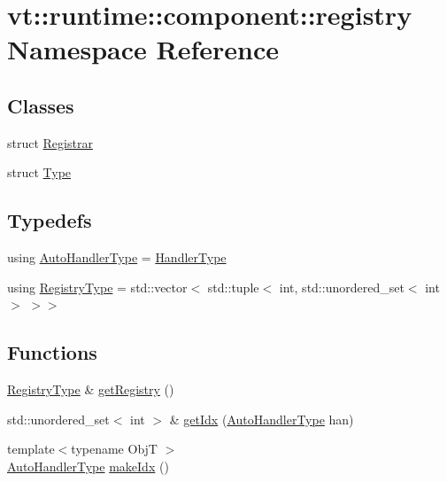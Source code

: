 \hypertarget{namespacevt_1_1runtime_1_1component_1_1registry}{}\section{vt\+:\+:runtime\+:\+:component\+:\+:registry Namespace Reference}
\label{namespacevt_1_1runtime_1_1component_1_1registry}
\subsection*{Classes}
\begin{DoxyCompactItemize}
\item 
struct \hyperlink{structvt_1_1runtime_1_1component_1_1registry_1_1_registrar}{Registrar}
\item 
struct \hyperlink{structvt_1_1runtime_1_1component_1_1registry_1_1_type}{Type}
\end{DoxyCompactItemize}
\subsection*{Typedefs}
\begin{DoxyCompactItemize}
\item 
using \hyperlink{namespacevt_1_1runtime_1_1component_1_1registry_a9b86518797c7bb91babf0ca8ee7d06e6}{Auto\+Handler\+Type} = \hyperlink{namespacevt_af64846b57dfcaf104da3ef6967917573}{Handler\+Type}
\item 
using \hyperlink{namespacevt_1_1runtime_1_1component_1_1registry_a5ea96dad7de653a58de4112fdf83de44}{Registry\+Type} = std\+::vector$<$ std\+::tuple$<$ int, std\+::unordered\+\_\+set$<$ int $>$ $>$$>$
\end{DoxyCompactItemize}
\subsection*{Functions}
\begin{DoxyCompactItemize}
\item 
\hyperlink{namespacevt_1_1runtime_1_1component_1_1registry_a5ea96dad7de653a58de4112fdf83de44}{Registry\+Type} \& \hyperlink{namespacevt_1_1runtime_1_1component_1_1registry_a225f039f053d2dd0feff25fec31d4739}{get\+Registry} ()
\item 
std\+::unordered\+\_\+set$<$ int $>$ \& \hyperlink{namespacevt_1_1runtime_1_1component_1_1registry_ac5395a243a27f04990a3ea01db41ac01}{get\+Idx} (\hyperlink{namespacevt_1_1runtime_1_1component_1_1registry_a9b86518797c7bb91babf0ca8ee7d06e6}{Auto\+Handler\+Type} han)
\item 
{\footnotesize template$<$typename ObjT $>$ }\\\hyperlink{namespacevt_1_1runtime_1_1component_1_1registry_a9b86518797c7bb91babf0ca8ee7d06e6}{Auto\+Handler\+Type} \hyperlink{namespacevt_1_1runtime_1_1component_1_1registry_afc84ed277c6fcec64cba12fa7477e37c}{make\+Idx} ()
\end{DoxyCompactItemize}


